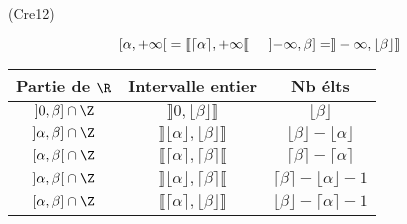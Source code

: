 \begin{tiny}(Cre12)\end{tiny} 
\[
 \left[ \alpha , +\infty \right[ = \llbracket \lceil \alpha \rceil , + \infty \llbracket \hspace{0.5cm}
 \left] -\infty , \beta \right] = \rrbracket -\infty , \lfloor \beta \rfloor \rrbracket
\]
\begin{center}
\renewcommand{\arraystretch}{1.5}
\begin{tabular}{|c|c|c|} \hline
Partie de $\R$  & Intervalle entier & Nb élts\\ \hline
$\left] 0 , \beta \right] \cap \Z$  & $\rrbracket 0 , \lfloor \beta\rfloor \rrbracket$ & $\lfloor \beta \rfloor$\\ \hline
$\left] \alpha , \beta \right] \cap \Z$ & $\rrbracket \lfloor \alpha\rfloor, \lfloor \beta\rfloor \rrbracket$ & $\lfloor \beta\rfloor - \lfloor \alpha\rfloor$\\ \hline
$\left[ \alpha , \beta \right[ \cap \Z$ & $\llbracket \lceil \alpha\rceil, \lceil \beta\rceil \llbracket$ & $\lceil \beta\rceil - \lceil \alpha\rceil$\\ \hline
$\left] \alpha , \beta \right[ \cap \Z$ & $\rrbracket \lfloor \alpha\rfloor, \lceil \beta\rceil \llbracket$ & $\lceil \beta\rceil - \lfloor \alpha\rfloor - 1 $\\ \hline
$\left[ \alpha , \beta \right] \cap \Z$ & $\llbracket \lceil \alpha\rceil, \lfloor \beta\rfloor \rrbracket$ & $\lfloor \beta\rfloor - \lceil \alpha\rceil - 1 $\\ \hline
\end{tabular}
\end{center}
